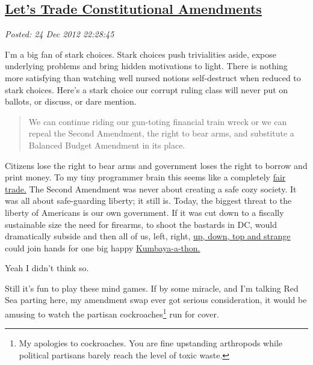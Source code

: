 %

\subsection*{\href{http://bakerjd99.wordpress.com/2012/12/24/lets-trade-constitutional-amendments/}{Let's Trade Constitutional Amendments}}


\noindent\emph{Posted: 24 Dec 2012 22:28:45}
\vspace{6pt}

I'm a big fan of stark choices. Stark choices push trivialities aside,
expose underlying problems and bring hidden motivations to light. There
is nothing more satisfying than watching well nursed notions
self-destruct when reduced to stark choices. Here's a stark choice our
corrupt ruling class will never put on ballots, or discuss, or dare
mention.

\begin{quote}
We can continue riding our gun-toting financial train wreck or we can
repeal the Second Amendment, the right to bear arms, and substitute a
Balanced Budget Amendment in its place.
\end{quote}

Citizens lose the right to bear arms and government loses the right to
borrow and print money. To my tiny programmer brain this seems like a
completely \href{http://www.globalexchange.org/programs/fairtrade}{fair
trade.} The Second Amendment was never about creating a safe cozy
society. It was all about safe-guarding liberty; it still is. Today, the
biggest threat to the liberty of Americans is our own government. If it
was cut down to a fiscally sustainable size the need for firearms, to
shoot the bastards in DC, would dramatically subside and then all of us,
left,
right, \href{http://public.web.cern.ch/public/en/science/standardmodel-en.html}{up,
down, top and strange} could join hands for one big happy
\href{http://www.urbandictionary.com/define.php?term=kumbaya}{Kumbaya-a-thon.}

Yeah I didn't think so.

Still it's fun to play these mind games. If by some miracle, and I'm
talking Red Sea parting here, my amendment swap ever got serious
consideration, it would be amusing to watch the partisan
cockroaches\footnote{
  My apologies to cockroaches. You are fine upstanding arthropods while
  political partisans barely reach the level of toxic
  waste.
} run for cover.


